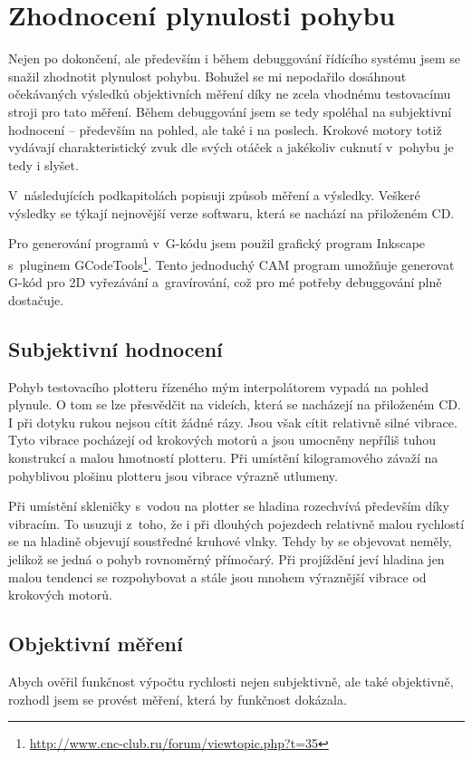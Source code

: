 \chapter{Zhodnocení plynulosti pohybu}

	Nejen po dokončení, ale především i během debuggování řídícího systému jsem se snažil zhodnotit plynulost pohybu. Bohužel se mi nepodařilo dosáhnout očekávaných výsledků objektivních měření díky ne zcela vhodnému testovacímu stroji pro tato měření. Během debuggování jsem se tedy spoléhal na subjektivní hodnocení -- především na pohled, ale také i na poslech. Krokové motory totiž vydávají charakteristický zvuk dle svých otáček a jakékoliv cuknutí v~pohybu je tedy i slyšet.
	
	V~následujících podkapitolách popisuji způsob měření a výsledky. Veškeré výsledky se týkají nejnovější verze softwaru, která se nachází na přiloženém CD.
	
	Pro generování programů v~G-kódu jsem použil grafický program Inkscape s~pluginem GCodeTools\footnote{\url{http://www.cnc-club.ru/forum/viewtopic.php?t=35}}. Tento jednoduchý CAM program umožňuje generovat G-kód pro 2D vyřezávání a~gravírování, což pro mé potřeby debuggování plně dostačuje.

	\section{Subjektivní hodnocení}
	Pohyb testovacího plotteru řízeného mým interpolátorem vypadá na pohled plynule. O tom se lze přesvědčit na videích, která se nacházejí na přiloženém CD. I při dotyku rukou nejsou cítit žádné rázy. Jsou však cítit relativně silné vibrace. Tyto vibrace pocházejí od krokových motorů a jsou umocněny nepříliš tuhou konstrukcí a malou hmotností plotteru. Při umístění kilogramového závaží na pohyblivou plošinu plotteru jsou vibrace výrazně utlumeny.
	
	Při umístění skleničky s~vodou na plotter se hladina rozechvívá především díky vibracím. To usuzuji z~toho, že i při dlouhých pojezdech relativně malou rychlostí se na hladině objevují soustředné kruhové vlnky. Tehdy by se objevovat neměly, jelikož se jedná o pohyb rovnoměrný přímočarý. Při projíždění  jeví hladina jen malou tendenci se rozpohybovat a stále jsou mnohem výraznější vibrace od krokových motorů.
	
	\section{Objektivní měření}
	Abych ověřil funkčnost výpočtu rychlosti nejen subjektivně, ale také objektivně, rozhodl jsem se provést měření, která by funkčnost dokázala.
	
